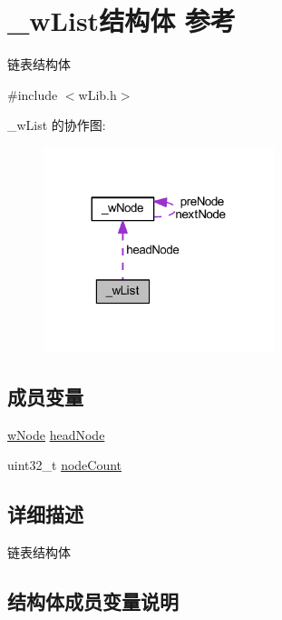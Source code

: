 \hypertarget{struct__w_list}{}\section{\+\_\+w\+List结构体 参考}
\label{struct__w_list}


链表结构体  




{\ttfamily \#include $<$w\+Lib.\+h$>$}



\+\_\+w\+List 的协作图\+:
\nopagebreak
\begin{figure}[H]
\begin{center}
\leavevmode
\includegraphics[width=191pt]{struct__w_list__coll__graph}
\end{center}
\end{figure}
\subsection*{成员变量}
\begin{DoxyCompactItemize}
\item 
\mbox{\hyperlink{w_lib_8h_a98363f2fc9ff1bef5993786140d900f2}{w\+Node}} \mbox{\hyperlink{struct__w_list_a306555352c507bb9f10c507680666624}{head\+Node}}
\item 
uint32\+\_\+t \mbox{\hyperlink{struct__w_list_a9ff3c0ff509d8eb055d29faa0ec185a1}{node\+Count}}
\end{DoxyCompactItemize}


\subsection{详细描述}
链表结构体 

\subsection{结构体成员变量说明}
\mbox{\label{struct__w_list_a306555352c507bb9f10c507680666624}} 
